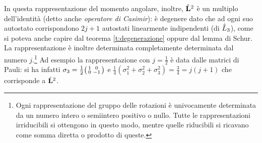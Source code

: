In questa rappresentazione del momento angolare, inoltre, $\hat{\mathbf{L}}^2$ è un multiplo dell'identità (detto anche \emph{operatore di Casimir}): è degenere dato che ad ogni suo autostato corrispondono $2j+1$ autostati linearmente indipendenti (di $\hat{L}_3$), come si poteva anche capire dal teorema \ref{t:degenerazione} oppure dal lemma di Schur.
La rappresentazione è inoltre determinata completamente determinata dal numero $j$.\footnote{Ogni rappresentazione del gruppo delle rotazioni è univocamente determinata da un numero intero o semiintero positivo o nullo. Tutte le rappresentazioni irriducibili si ottengono in questo modo, mentre quelle riducibili si ricavano come somma diretta o prodotto di queste.}
Ad esempio la rappresentazione con $j=\frac12$ è data dalle matrici di Pauli: si ha infatti $\sigma_3=\frac12\begin{psmallmatrix}1&0\\0&-1\end{psmallmatrix}$ e $\frac14(\sigma_1^2+\sigma_2^2+\sigma_3^2)=\frac34=j(j+1)$ che corrisponde a $\hat{\mathbf{L}}^2$.


